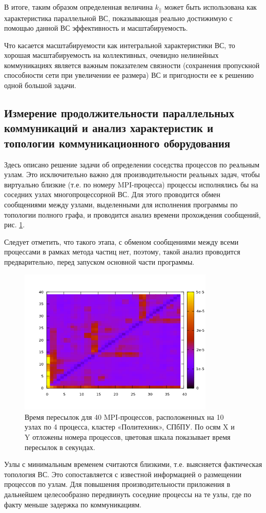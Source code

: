 		В итоге, таким образом определенная  величина $k_{||} $ может быть использована как характеристика параллельной ВС, показывающая реально достижимую с помощью данной ВС эффективность и масштабируемость.
		
		Что касается масштабируемости как интегральной характеристики ВС, то хорошая масштабируемость на коллективных, очевидно нелинейных коммуникациях является важным показателем связности (сохранения пропускной способности сети при увеличении ее размера) ВС и пригодности ее к решению одной большой задачи.
		
		\subsection{Измерение продолжительности параллельных коммуникаций и анализ характеристик и топологии коммуникационного оборудования}
		Здесь описано решение задачи об определении соседства процессов по реальным узлам. Это исключительно важно для производительности реальных задач, чтобы виртуально близкие (т.е. по номеру MPI-процесса) процессы исполнялись бы на соседних узлах многопроцессорной ВС. Для этого проводится обмен сообщениями между узлами, выделенными 
		для исполнения программы по топологии полного графа, и проводится анализ времени прохождения сообщений, рис. \ref{poly_all2all}.  
		
		Следует отметить, что такого этапа, с обменом сообщениями между всеми процессами в рамках метода частиц нет, поэтому, такой анализ проводится предварительно, перед запуском основной части программы.

		
		\begin{figure}[htb]
			\begin{center}
				\includegraphics[height=7cm,keepaspectratio]{images/polytech_all_to_all.png}
			\end{center}
			\caption{Время пересылок для 40 MPI-процессов, расположенных на 10 узлах по 4 процесса, кластер «Политехник», СПбПУ. По осям X и Y отложены номера процессов, цветовая шкала показывает время пересылок в секундах.}
			\label{poly_all2all}
		\end{figure} 
		Узлы с минимальным временем считаются близкими, т.е. выясняется фактическая топология ВС. Это сопоставляется с известной информацией о размещении процессов по узлам.	Для повышения производительности приложения в дальнейшем целесообразно передвинуть соседние процессы на те узлы, где по факту меньше задержка по коммуникациям.
		
